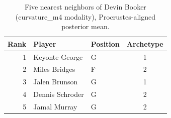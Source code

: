 \begin{table}[htbp]
  \centering\small
  \begin{tabular}{rllc}
    \toprule
    Rank & Player & Position & Archetype \\
    \midrule
    1 & Keyonte George & G & 1 \\
    2 & Miles Bridges & F & 2 \\
    3 & Jalen Brunson & G & 1 \\
    4 & Dennis Schroder & G & 2 \\
    5 & Jamal Murray & G & 2 \\
    \bottomrule
  \end{tabular}
  \caption{Five nearest neighbors of Devin Booker (curvature_m4 modality), Procrustes-aligned posterior mean.}
  \label{tab:Devin_Booker_neighbors_curvature_m4}
\end{table}


